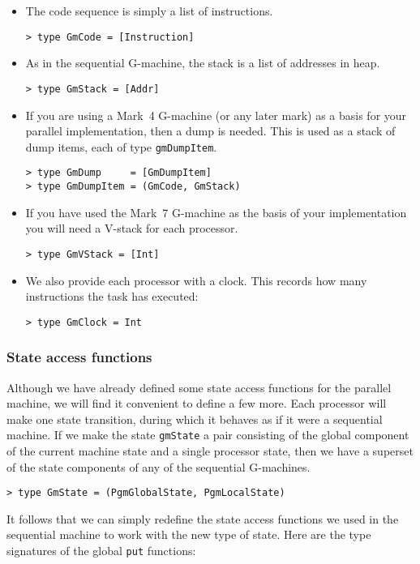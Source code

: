 \begin{itemize}
\item The code sequence is simply a list of instructions.
\begin{verbatim}
> type GmCode = [Instruction]
\end{verbatim}
%
\item As in the sequential G-machine, the stack is a list of addresses
in heap.
\begin{verbatim}
> type GmStack = [Addr]
\end{verbatim}
%
\item If you are using a Mark~4 G-machine (or any later mark) as a
basis for your parallel implementation, then a dump is needed. This is
used as a stack of dump items, each of type
\mbox{\tt gmDumpItem}.
\begin{verbatim}
> type GmDump     = [GmDumpItem]
> type GmDumpItem = (GmCode, GmStack)
\end{verbatim}
%
%
\item If you have used the Mark~7 G-machine as the basis of your
implementation you will need a V-stack for each processor.
\begin{verbatim}
> type GmVStack = [Int]
\end{verbatim}
%

\item We also provide each processor with a clock. This records how
many instructions the task has executed:
\begin{verbatim}
> type GmClock = Int
\end{verbatim}
%
\end{itemize}

\subsubsection{State access functions}

Although we have already defined some state access functions for the
parallel machine, we will find it convenient to define a few more.
Each processor will make one state transition, during
which it behaves as if it were a sequential machine.  If we make the
state \mbox{\tt gmState} a pair consisting of the global component of the
current machine state and a single processor state, then we have a
superset of the state components of any of the sequential G-machines.
\begin{verbatim}
> type GmState = (PgmGlobalState, PgmLocalState)
\end{verbatim}
%
\par
It follows that we can simply redefine the state access functions we
used in the sequential machine to work with the new type of state.
Here are the type signatures of the global \mbox{\tt put} functions:

